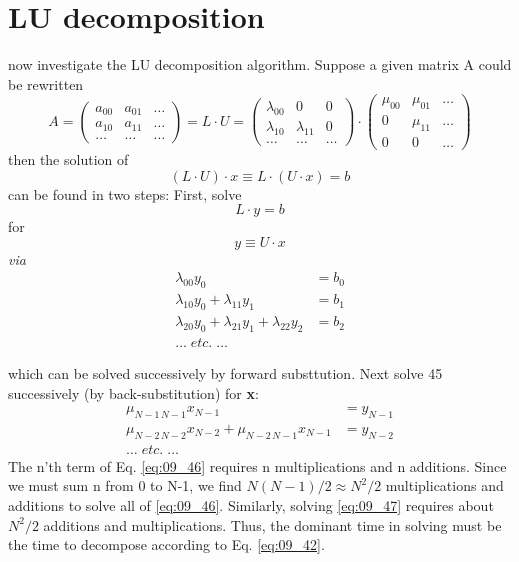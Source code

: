 \section{LU decomposition}
 now investigate the LU decomposition algorithm. Suppose a given matrix A could be rewritten
\begin{equation}
    \label{eq:09_42}
    A = 
    \begin{pmatrix}
        a_{00}&a_{01} &\dots\\
        a_{10}&a_{11} &\dots\\
        \dots&\dots &\dots
    \end{pmatrix}
    = L \cdot U =
    \begin{pmatrix}
        \lambda_{00}&0 &0\\
        \lambda_{10}&\lambda_{11} &0\\
        \dots&\dots &\dots
    \end{pmatrix}
    \cdot
    \begin{pmatrix}
        \mu_{00}&\mu_{01} &\dots\\
        0&\mu_{11} &\dots\\
        0&0 &\dots
    \end{pmatrix}
\end{equation} 
then the solution of
\begin{equation}
    \label{eq:09_43}
    (L \cdot U ) \cdot x \equiv L \cdot (U \cdot x) = b
\end{equation} 
can be found in two steps: First, solve
\begin{equation}
    \label{eq:09_44}
    L \cdot y = b
\end{equation} 
for
\begin{equation}
    \label{eq:09_45}
    y \equiv U  \cdot x
\end{equation} 
\textit{via}
\begin{align}
    \label{eq:09_46}
    \lambda_{00} y_0 &= b_0 \nonumber \\
    \lambda_{10} y_0 + \lambda_{11} y_1 &= b_1 \\
    \lambda_{20} y_0 + \lambda_{21} y_1 + \lambda_{22} y_2 &= b_2 \nonumber \\
    \dots \;\textit{etc.} \;\dots \nonumber
\end{align}

which can be solved successively by forward substtution. Next
solve 45 successively (by back-substitution) for \textbf{x}:
\begin{align}
    \label{eq:09_47}
    \mu_{N-1\, N-1} x_{N-1} &= y_{N-1} \nonumber \\
    \mu_{N-2\, N-2} x_{N-2} + \mu_{N-2\, N-1} x_{N-1} &= y_{N-2} \\
    \dots \;\textit{etc.} \;\dots \nonumber
\end{align}
The n'th term of Eq. \ref{eq:09_46} requires n multiplications and n additions.
Since we must sum n from 0 to N-1, we find $N(N-1)/2 \approx N^2/2$
multiplications and additions to solve all of \ref{eq:09_46}. Similarly, solving 
\ref{eq:09_47} requires about $N^2/2$ additions and multiplications. Thus, the
dominant time in solving must be the time to decompose according to Eq. \ref{eq:09_42}.

